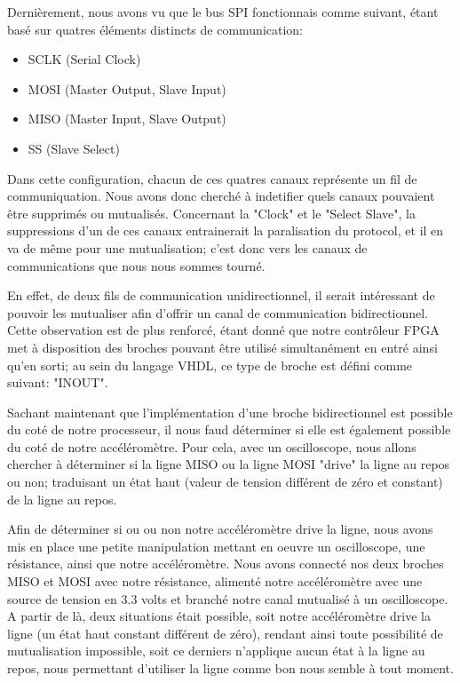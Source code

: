 \documentclass[french,a4paper,12pt]{report}
\begin{document}
	Dernièrement, nous avons vu que le bus SPI fonctionnais comme suivant, étant basé sur quatres éléments distincts de communication:
	
	\begin{itemize}
		\item SCLK (Serial Clock) 
		\item MOSI (Master Output, Slave Input) 
		\item MISO (Master Input, Slave Output) 
		\item SS (Slave Select)
	\end{itemize}
	
	Dans cette configuration, chacun de ces quatres canaux représente un fil de communiquation. Nous avons donc cherché à indetifier quels canaux pouvaient être supprimés ou mutualisés. Concernant la "Clock" et le "Select Slave", la suppressions d'un de ces canaux entrainerait la paralisation du protocol, et il en va de même pour une mutualisation; c'est donc vers les canaux de communications que nous nous sommes tourné.
	
	En effet, de deux fils de communication unidirectionnel, il serait intéressant de pouvoir les mutualiser afin d'offrir un canal de communication bidirectionnel. Cette observation est de plus renforcé, étant donné que notre contrôleur FPGA met à disposition des broches pouvant être utilisé simultanément en entré ainsi qu'en sorti; au sein du langage VHDL, ce type de broche est défini comme suivant: "INOUT".
	
	Sachant maintenant que l'implémentation d'une broche bidirectionnel est possible du coté de notre processeur, il nous faud déterminer si elle est également possible du coté de notre accéléromètre. Pour cela, avec un oscilloscope, nous allons chercher à déterminer si la ligne MISO ou la ligne MOSI "drive" la ligne au repos ou non; traduisant un état haut (valeur de tension différent de zéro et constant) de la ligne au repos.
	
	Afin de déterminer si ou ou non notre accéléromètre drive la ligne, nous avons mis en place une petite manipulation mettant en oeuvre un oscilloscope, une résistance, ainsi que notre accéléromètre. Nous avons connecté nos deux broches MISO et MOSI avec notre résistance, alimenté notre accéléromètre avec une source de tension en 3.3 volts et branché notre canal mutualisé à un oscilloscope. A partir de là, deux situations était possible, soit notre accéléromètre drive la ligne (un état haut constant différent de zéro), rendant ainsi toute possibilité de mutualisation impossible, soit ce derniers n'applique aucun état à la ligne au repos, nous permettant d'utiliser la ligne comme bon nous semble à tout moment.
	
\end{document}
